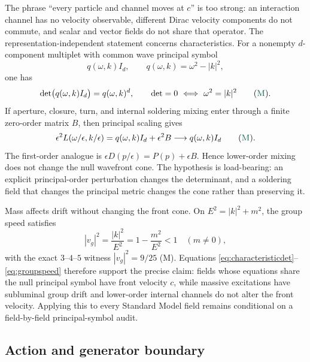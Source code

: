 \documentclass[11pt]{article}
\newcommand{\Mtag}{\textcolor{verified}{\textsc{M}}}
\begin{document}
The phrase ``every particle and channel moves at $c$'' is too strong: an
interaction channel has no velocity observable, different Dirac velocity
components do not commute, and scalar and vector fields do not share that
operator.  The representation-independent statement concerns characteristics.
For a nonempty $d$-component multiplet with common wave principal symbol
\begin{equation}\label{eq:principalsymbol}
 q(\omega,k)I_d,\qquad q(\omega,k)=\omega^2-|k|^2,
\end{equation}
one has
\begin{equation}\label{eq:characteristicdet}
 \det\bigl(q(\omega,k)I_d\bigr)=q(\omega,k)^d,
 \qquad \det=0\ \Longleftrightarrow\ \omega^2=|k|^2
 \qquad(\Mtag).
\end{equation}
If aperture, closure, turn, and internal soldering mixing enter through a
finite zero-order matrix $B$, then principal scaling gives
\begin{equation}\label{eq:lowerscaling}
 \epsilon^2L(\omega/\epsilon,k/\epsilon)
 =q(\omega,k)I_d+\epsilon^2B
 \longrightarrow q(\omega,k)I_d
 \qquad(\Mtag).
\end{equation}
The first-order analogue is
$\epsilon D(p/\epsilon)=P(p)+\epsilon B$.  Hence lower-order mixing does not
change the null wavefront cone.  The hypothesis is load-bearing: an explicit
principal-order perturbation changes the determinant, and a soldering field
that changes the principal metric changes the cone rather than preserving it.

Mass affects drift without changing the front cone.  On
$E^2=|k|^2+m^2$, the group speed satisfies
\begin{equation}\label{eq:groupspeed}
 |v_g|^2=\frac{|k|^2}{E^2}=1-\frac{m^2}{E^2}<1
 \quad(m\ne0),
\end{equation}
with the exact $3$--$4$--$5$ witness $|v_g|^2=9/25$ (\Mtag).  Equations
\eqref{eq:characteristicdet}--\eqref{eq:groupspeed} therefore support the
precise claim: fields whose equations share the null principal symbol have
front velocity $c$, while massive excitations have subluminal group drift and
lower-order internal channels do not alter the front velocity.  Applying this
to every Standard Model field remains conditional on a field-by-field
principal-symbol audit.

\subsection{Action and generator boundary}
\end{document}
